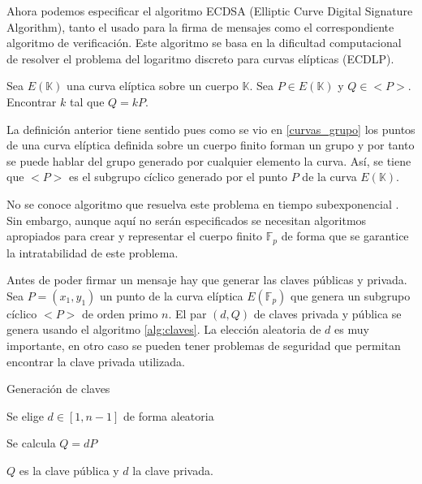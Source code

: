Ahora podemos especificar el algoritmo ECDSA (Elliptic Curve Digital Signature Algorithm)\citep{elliptic_cripto}, tanto el usado para la firma de mensajes como el correspondiente algoritmo de verificación. Este algoritmo se basa en la dificultad computacional de resolver el problema del logaritmo discreto para curvas elípticas (ECDLP).

\theoremstyle{definition}\begin{definition}\label{ecdlp} Sea $E(\mathbb{K})$ una curva elíptica sobre un cuerpo $\mathbb{K}$. Sea $P \in E(\mathbb{K})$ y $Q  \in  <P>$. Encontrar $k$ tal que $Q= kP$. \end{definition}

La definición anterior tiene sentido pues como se vio en \ref{curvas_grupo} los puntos de una curva elíptica definida sobre un cuerpo finito forman un grupo y por tanto se puede hablar del grupo generado por cualquier elemento la curva. Así, se tiene que $<P>$ es el subgrupo cíclico generado por el punto $P$ de la curva $E(\mathbb{K})$. 

No se conoce algoritmo que resuelva este problema en tiempo subexponencial \citep{discrete_log}. Sin embargo, aunque aquí no serán especificados se necesitan algoritmos apropiados para crear y representar el cuerpo finito $\mathbb{F}_{p}$ de forma que se garantice la intratabilidad de este problema.

Antes de poder firmar un mensaje hay que generar las claves públicas y privada.
Sea $P = (x_{1},y_{1})$ un punto de la curva elíptica $E(\mathbb{F}_{p})$ que genera un subgrupo cíclico $<P>$ de orden primo $n$. El par $(d,Q)$ de claves privada y pública se genera usando el algoritmo \ref{alg:claves}. La elección aleatoria de $d$ es muy importante, en otro caso se pueden tener problemas de seguridad que permitan encontrar la clave privada utilizada.
\begin{algorithm}
\caption{Generación de claves}\label{alg:claves}
\begin{algorithmic}[1]

\State Se elige $d \in [1, n-1]$ de forma aleatoria

\State Se calcula $Q=dP$

\State  $Q$ es la clave pública y $d$ la clave privada.
\end{algorithmic}
\end{algorithm}


